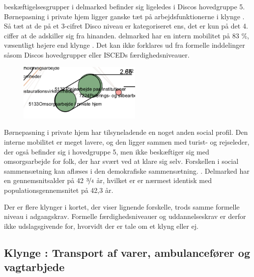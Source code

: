 beskæftigelsesgrupper i delmarked  befinder sig ligeledes i Discos hovedgruppe 5. Børnepasning i private hjem ligger ganske tæt på arbejdsfunktionerne i klynge . Så tæt at de på et 3-cifret Disco niveau er kategoriseret ens, det er kun på det 4. ciffer at de adskiller sig fra hinanden. delmarked  har en intern mobilitet på 83 \%, væsentligt højere end klynge . Det kan ikke forklares ud fra formelle inddelinger såsom Discos hovedgrupper eller ISCEDs færdighedsniveauer.

%
\begin{figure}
  \vspace{-20pt}
  \begin{center}
    \includegraphics[width=6cm]{fig/segzoom/seg_2_66_internmob.pdf}
   \caption{}
   \label{fig_delanalyse1_zoom_2_66}
  \end{center}
  \vspace{-20pt}
\end{figure}
%

Børnepasning i private hjem har tilsyneladende en noget anden social profil. Den interne mobilitet er meget lavere, og den ligger sammen med turist- og rejseleder, der også befinder sig i hovedgruppe 5, men ikke beskæftiger sig med omsorgsarbejde for folk, der har svært ved at klare sig selv. Forskellen i social sammensætning kan aflæses i den demokrafiske sammensætning. 
%
. Delmarked  har en gennemsnitsalder på 42 $\nicefrac{3}{4}$ år, hvilket er er nærmest identisk med populationsgennemsnitet på 42,3 år. %



Der er flere klynger i kortet, der viser lignende forskelle, trods samme formelle niveau i adgangskrav. Formelle færdighedsniveauer og uddannelseskrav er derfor ikke udslagsgivende for, hvorvidt der er tale om et klyng eller ej. %


\subsection{Klynge : Transport af varer, ambulancefører og vagtarbjede}

